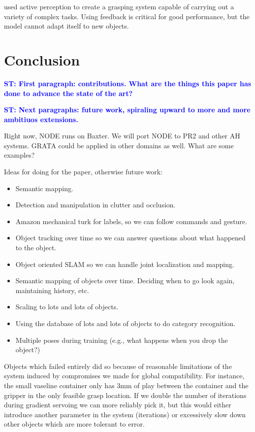 \documentclass{article}
\newcommand{\stnote}[1]{\textcolor{blue}{\textbf{ST: #1}}}
\begin{document}
\citet{hudson12} used active perception to create a grasping system
capable of carrying out a variety of complex tasks.  Using feedback is
critical for good performance, but the model cannot adapt itself to
new objects.



\section{Conclusion}

\label{sec:conclusion}

\stnote{First paragraph:  contributions.  What are the things this paper has done to advance the state of the art?}

\stnote{Next paragraphs: future work, spiraling upward to more and
  more ambitiuos extensions.}

Right now, NODE runs on Baxter. We will port NODE to PR2 and other AH systems.
GRATA could be applied in other domains as well.  What are some examples?

Ideas for doing for the paper, otherwise future work: 
\begin{itemize}
\item Semantic mapping. 
\item Detection and manipulation in clutter and occlusion.
\item Amazon mechanical turk for labels, so we can follow commands and gesture.
\item Object tracking over time so we can answer questions about what
  happened to the object.
\item Object oriented SLAM so we can handle joint localization and mapping.
\item Semantic mapping of objects over time.  Deciding when to go look
  again, maintaining history, etc. 
\item Scaling to lots and lots of objects.
\item Using the database of lots and lots of objects to do category recognition.
\item Multiple poses during training (e.g., what happens when you drop
  the object?)
\end{itemize}

Objects which failed entirely did so because of reasonable limitations of the
system induced by compromises we made for global compatibility. For instance,
the small vaseline container only has 3mm of play between the container and the
gripper in the only feasible grasp location. If we double the number of iterations
during gradient servoing we can more reliably pick it, but this would either
introduce another parameter in the system (iterations) or excessively slow down
other objects which are more tolerant to error.


{\tiny


}
\end{document}
